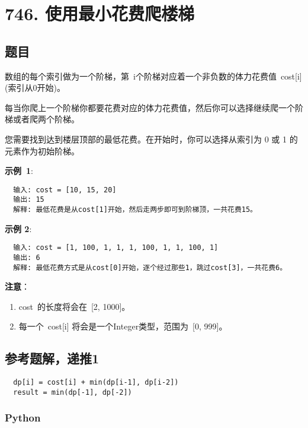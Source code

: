 \newpage
\section{746. 使用最小花费爬楼梯}
\label{leetcode:746}

\subsection{题目}

数组的每个索引做为一个阶梯，第 i个阶梯对应着一个非负数的体力花费值 cost[i](索引从0开始)。

每当你爬上一个阶梯你都要花费对应的体力花费值，然后你可以选择继续爬一个阶梯或者爬两个阶梯。

您需要找到达到楼层顶部的最低花费。在开始时，你可以选择从索引为 0 或 1 的元素作为初始阶梯。

\textbf{示例 1}:

\begin{verbatim}
  输入: cost = [10, 15, 20]
  输出: 15
  解释: 最低花费是从cost[1]开始，然后走两步即可到阶梯顶，一共花费15。
\end{verbatim}

\textbf{示例 2}:

\begin{verbatim}
  输入: cost = [1, 100, 1, 1, 1, 100, 1, 1, 100, 1]
  输出: 6
  解释: 最低花费方式是从cost[0]开始，逐个经过那些1，跳过cost[3]，一共花费6。
\end{verbatim}

\textbf{注意}：

\begin{enumerate}
  \item cost 的长度将会在 [2, 1000]。
  \item 每一个 cost[i] 将会是一个Integer类型，范围为 [0, 999]。
\end{enumerate}

\subsection{参考题解，递推1}

\begin{verbatim}
  dp[i] = cost[i] + min(dp[i-1], dp[i-2])
  result = min(dp[-1], dp[-2])
\end{verbatim}

\subsubsection{Python}

